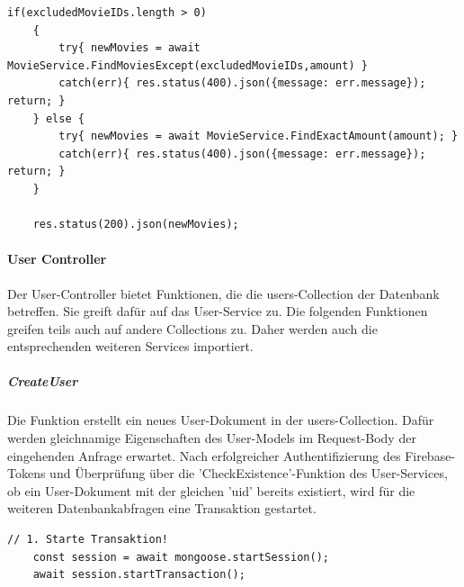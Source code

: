 \begin{lstlisting}[caption=MovieController - RequestMovie - Excluded Movies, label=lst:MovieControllerExcludedMovies]
    if(excludedMovieIDs.length > 0)
    {
        try{ newMovies = await MovieService.FindMoviesExcept(excludedMovieIDs,amount) } 
        catch(err){ res.status(400).json({message: err.message}); return; }
    } else {
        try{ newMovies = await MovieService.FindExactAmount(amount); } 
        catch(err){ res.status(400).json({message: err.message}); return; }
    }

    res.status(200).json(newMovies);
\end{lstlisting}




%
%



\paragraph{User Controller}
Der User-Controller bietet Funktionen, die die users-Collection der Datenbank betreffen. Sie greift dafür auf das User-Service zu. Die folgenden Funktionen greifen teils auch auf andere Collections zu. Daher werden auch die entsprechenden weiteren Services importiert.

\noindent
\subparagraph{CreateUser}
Die Funktion erstellt ein neues User-Dokument in der users-Collection. Dafür werden gleichnamige Eigenschaften des User-Models im Request-Body der eingehenden Anfrage erwartet. Nach erfolgreicher Authentifizierung des Firebase-Tokens und Überprüfung über die 'CheckExistence'-Funktion des User-Services, ob ein User-Dokument mit der gleichen 'uid' bereits existiert, wird für die weiteren Datenbankabfragen eine Transaktion gestartet.

\begin{lstlisting}[caption=UserController - Create User - Transaktionsstart, label=lst:UserControllertransaction]
    // 1. Starte Transaktion!
    const session = await mongoose.startSession();
    await session.startTransaction();
\end{lstlisting}

